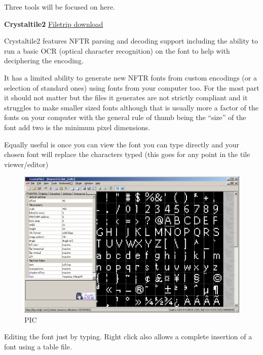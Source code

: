 \documentclass[
]{book}
\begin{document}
Three tools will be focused on here.

\textbf{Crystaltile2} \href{http://filetrip.net/f23649-CrystalTile2-2010-09-06.html}{Filetrip download}

Crystaltile2 features NFTR parsing and decoding support including the ability to run a basic OCR (optical character recognition) on the font to help with deciphering the encoding.

It has a limited ability to generate new NFTR fonts from custom encodings (or a selection of standard ones) using fonts from your computer too. For the most part it should not matter but the files it generates are not strictly compliant and it struggles to make smaller sized fonts although that is usually more a factor of the fonts on your computer with the general rule of thumb being the ``size'' of the font add two is the minimum pixel dimensions.

Equally useful is once you can view the font you can type directly and your chosen font will replace the characters typed (this goes for any point in the tile viewer/editor)

\begin{figure}
\centering
\includegraphics{images/110_home_fast6191_romhackingguide_unrenamed_fil___rders_romhackingguidefontnftrcrystaltile2_1.png}
\caption{PIC}
\end{figure}

Editing the font just by typing. Right click also allows a complete insertion of a font using a table file.
\end{document}
